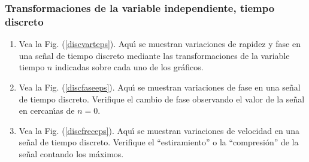 \subsubsection{Transformaciones de la variable independiente, tiempo discreto}

\begin{enumerate}

\item Vea la Fig. (\ref{discvarteps}).  Aqu\'{\i} se muestran
  variaciones de rapidez y fase en una se\~{n}al de tiempo discreto
  mediante las transformaciones de la variable tiempo $n$ indicadas
  sobre cada uno de los gr\'{a}ficos.

\item Vea la Fig. (\ref{discfaseeps}). Aqu\'{\i} se muestran
  variaciones de fase en una se\~{n}al de tiempo discreto.  Verifique
  el cambio de fase observando el valor de la se\~{n}al en
  cercan\'{\i}as de $n = 0$.

\item Vea la Fig. (\ref{discfreceps}). Aqu\'{\i} se muestran
  variaciones de velocidad en una se\~{n}al de tiempo discreto.
  Verifique el ``estiramiento'' o la ``compresi\'{o}n'' de la
  se\~{n}al contando los m\'{a}ximos.

\end{enumerate}




